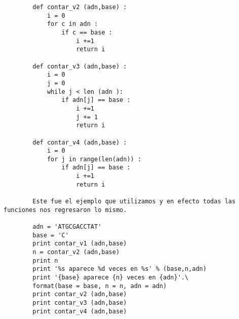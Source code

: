 \documentclass{article} %
\begin{document}
\begin{enumerate}
\begin{verbatim}
		def contar_v2 (adn,base) :
		    i = 0
		    for c in adn :
		        if c == base :
		            i +=1
		            return i
		
		def contar_v3 (adn,base) :
		    i = 0
		    j = 0
		    while j < len (adn ):
		        if adn[j] == base :
		            i +=1
		            j += 1
		            return i
		
		def contar_v4 (adn,base) :
		    i = 0
		    for j in range(len(adn)) :
		        if adn[j] == base :
		            i +=1
		            return i
		
		Este fue el ejemplo que utilizamos y en efecto todas las funciones nos regresaron lo mismo.
		
		adn = 'ATGCGACCTAT'
		base = 'C'
		print contar_v1 (adn,base)
		n = contar_v2 (adn,base)
		print n
		print '%s aparece %d veces en %s' % (base,n,adn)
		print '{base} aparece {n} veces en {adn}'.\
		format(base = base, n = n, adn = adn)
		print contar_v2 (adn,base) 
		print contar_v3 (adn,base) 
		print contar_v4 (adn,base) 
	\end{verbatim}
\end{enumerate}
\end{document}

